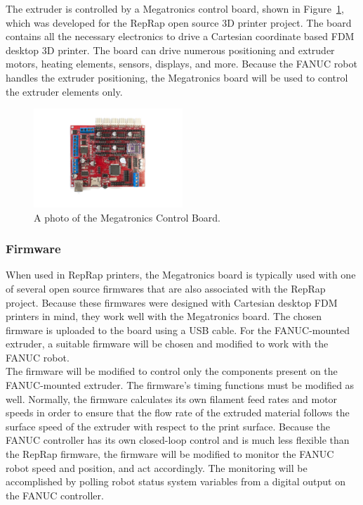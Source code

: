 \indent 

The extruder is controlled by a Megatronics control board, shown in Figure~\ref{fig:megatronics}, which was developed for the RepRap open source 3D printer project. The board contains all the necessary electronics to drive a Cartesian coordinate based FDM desktop 3D printer. The board can drive numerous positioning and extruder motors, heating elements, sensors, displays, and more. Because the FANUC robot handles the extruder positioning, the Megatronics board will be used to control the extruder elements only.\\

\begin{figure}[htp]
\centering
\includegraphics[width=0.5\textwidth]{./figures/electronics-board}
\caption{A photo of the Megatronics Control Board.}
\label{fig:megatronics}
\end{figure}

\subsubsection{Firmware}

\indent

When used in RepRap printers, the Megatronics board is typically used with one of several open source firmwares that are also associated with the RepRap project. Because these firmwares were designed with Cartesian desktop FDM printers in mind, they work well with the Megatronics board. The chosen firmware is uploaded to the board using a USB cable. For the FANUC-mounted extruder, a suitable firmware will be chosen and modified to work with the FANUC robot.\\

The firmware will be modified to control only the components present on the FANUC-mounted extruder. The firmware's timing functions must be modified as well. Normally, the firmware calculates its own filament feed rates and motor speeds in order to ensure that the flow rate of the extruded material follows the surface speed of the extruder with respect to the print surface. Because the FANUC controller has its own closed-loop control and is much less flexible than the RepRap firmware, the firmware will be modified to monitor the FANUC robot speed and position, and act accordingly. The monitoring will be accomplished by polling robot status system variables from a digital output on the FANUC controller.

